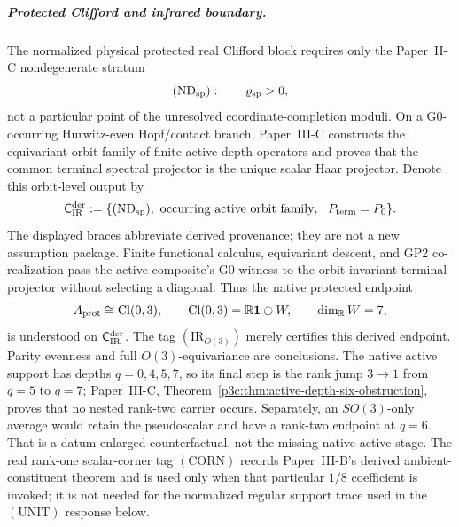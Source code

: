 \documentclass[12pt,a4paper]{article}
\begin{document}
\subparagraph{Protected Clifford and infrared boundary.}
The normalized physical protected real Clifford block requires only the
Paper~II-C nondegenerate stratum
\[
 (\mathrm{ND}_{\rm sp}):\qquad \varrho_{\rm sp}>0,
\]
not a particular point of the unresolved coordinate-completion moduli.  On a
G0-occurring Hurwitz-even Hopf/contact branch, Paper~III-C constructs the
equivariant orbit family of finite active-depth operators and proves that the
common terminal spectral projector is the unique scalar Haar projector.
Denote this orbit-level output by
\[
 \mathsf C_{\rm IR}^{\rm der}
 :=\{(\mathrm{ND}_{\rm sp}),\ \text{occurring active orbit family},\
       \ P_{\rm term}=P_0\}.
\]
The displayed braces abbreviate derived provenance; they are not a new
assumption package.  Finite functional calculus, equivariant descent, and GP2
co-realization pass the active composite's G0 witness to the orbit-invariant
terminal projector without selecting a diagonal.  Thus the native
protected endpoint
\[
 A_{\rm prot}\cong\operatorname{Cl}(0,3),
 \qquad
 \operatorname{Cl}(0,3)=\mathbb R\mathbf1\oplus W,
 \qquad
 \dim_{\mathbb R}W=7,
\]
is understood on \(\mathsf C_{\rm IR}^{\rm der}\).  The tag
\((\mathrm{IR}_{O(3)})\) merely certifies this derived endpoint.  Parity
evenness and full \(O(3)\)-equivariance are conclusions.  The native active
support has depths \(q=0,4,5,7\), so its final step is the rank jump
\(3\to1\) from \(q=5\) to \(q=7\); Paper~III-C,
Theorem~\ref{p3c:thm:active-depth-six-obstruction}, proves that no nested
rank-two carrier occurs.  Separately, an \(SO(3)\)-only average would retain
the pseudoscalar and have a rank-two endpoint at \(q=6\).  That is a
datum-enlarged counterfactual, not the missing native active stage.
The real rank-one scalar-corner tag \((\mathrm{CORN})\) records Paper~III-B's
derived ambient-constituent theorem and is used only when that particular
\(1/8\) coefficient is invoked; it is not needed for the normalized regular
support trace used in the \((\mathrm{UNIT})\) response below.
\end{document}
